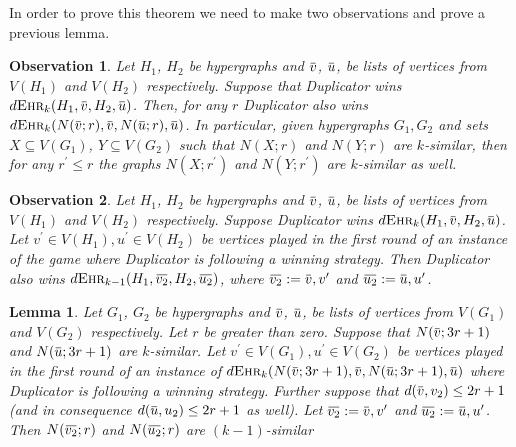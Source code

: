 \documentclass[12pt,notitlepage,a4paper]{article}
\newtheorem{obs}{Observation}[section]
\newtheorem{lemma}{Lemma}[section]
\theoremstyle{definition}
\newcommand{\overbar}[1]{\mkern 1.5mu\overline{\mkern-1.5mu#1\mkern-1.5mu}\mkern 1.5mu}
\newcommand{\ehr}{\textsc{Ehr}}
\begin{document}
In order to prove this theorem we need to make two observations
and prove a previous lemma. 

\begin{obs} \label{obs1}
	Let $H_1$, $H_2$ be hypergraphs and 
	$\overbar{v}$, $\overbar{u}$, be lists of vertices
	from $V(H_1)$ and $V(H_2)$ respectively. Suppose that
	Duplicator wins $d\ehr_k(H_1,\overbar{v},H_2,\overbar{u})$.
	Then, for any $r$ Duplicator also wins
	$d\ehr_k(N(\overbar{v};r),\overbar{v},N(\overbar{u};r),\overbar{u})$. 
	In particular, given hypergraphs $G_1, G_2$ and sets
	$X\subseteq V(G_1)$, $Y\subseteq V(G_2)$ such that
	$N(X;r)$ and $N(Y;r)$ are $k$-similar, then for any 
	$r^\prime \leq r$ the graphs
	$N(X;r^\prime)$ and $N(Y;r^\prime)$ are $k$-similar
	as well. 
\end{obs}

\begin{obs} \label{obs2}
	Let $H_1$, $H_2$ be hypergraphs and 
	$\overbar{v}$, $\overbar{u}$, be lists of vertices
	from $V(H_1)$ and $V(H_2)$ respectively. Suppose 
	Duplicator wins $d\ehr_k(H_1,\overbar{v},H_2,\overbar{u})$. 
	Let $v^\prime\in V(H_1),u^\prime\in V(H_2)$ be vertices
	played in the first round of an instance of the game 
	where Duplicator is following a winning strategy. Then 
	Duplicator also wins $d\ehr_{k-1}(H_1,\overbar{v_2},
	H_2,\overbar{u_2})$, where $\overbar{v_2}:=\overbar{v},v^\prime$
	and $\overbar{u_2}:=\overbar{u},u^\prime$.
\end{obs}

\begin{lemma} \label{lemm:Duplicator}
	Let $G_1$, $G_2$ be hypergraphs and 
	$\overbar{v}$, $\overbar{u}$, be lists of vertices
	from $V(G_1)$ and $V(G_2)$ respectively. Let
	$r$ be greater than zero. Suppose that
	$N(\overbar{v};3r+1)$ and $N(\overbar{u};3r+1)$ are 
	$k$-similar. Let $v^\prime\in V(G_1),u^\prime\in V(G_2)$
	be vertices played in the first round of an instance of 
	$d\ehr_k(N(\overbar{v};3r+1),\overbar{v},N(\overbar{u};3r+1),\overbar{u})$ 
	where Duplicator is following a winning strategy. Further suppose
	that $d(\overbar{v},v_2)\leq 2r+1$ (and in consequence
	$d(\overbar{u},u_2)\leq 2r+1$ as well). 
	Let $\overbar{v_2}:=\overbar{v},v^\prime$
	and $\overbar{u_2}:=\overbar{u},u^\prime$.
	Then $N(\overbar{v_2};r)$ and $N(\overbar{u_2};r)$ are 
	$(k-1)$-similar
\end{lemma}
\end{document}
